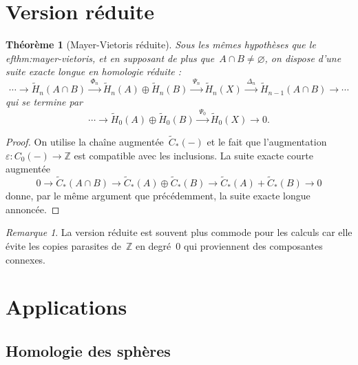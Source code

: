 \documentclass[12pt,a4paper,openany]{book}
\theoremstyle{definition}
\theoremstyle{plain}
\newtheorem{theoreme}[definition]{Théorème}
\theoremstyle{remark}
\newtheorem{remarque}[definition]{Remarque}
\newcommand{\Z}{\mathbb{Z}}
\begin{document}
\section{Version réduite}\label{sec:mv-reduite}

\begin{theoreme}[Mayer-Vietoris réduite]\label{thm:mv-reduite}
Sous les mêmes hypothèses que le 
ef{thm:mayer-vietoris}, et en supposant de plus
que~$A \cap B \neq \varnothing$, on dispose d'une suite exacte longue en homologie
réduite :
\[
  \cdots \longrightarrow \widetilde{H}_n(A \cap B)
  \xrightarrow{\;\Phi_n\;}
  \widetilde{H}_n(A) \oplus \widetilde{H}_n(B)
  \xrightarrow{\;\Psi_n\;}
  \widetilde{H}_n(X)
  \xrightarrow{\;\Delta_n\;}
  \widetilde{H}_{n-1}(A \cap B)
  \longrightarrow \cdots
\]
qui se termine par
\[
  \cdots \longrightarrow \widetilde{H}_0(A) \oplus \widetilde{H}_0(B)
  \xrightarrow{\;\Psi_0\;} \widetilde{H}_0(X) \longrightarrow 0.
\]
\end{theoreme}

\begin{proof}
On utilise la chaîne augmentée~$\widetilde{C}_*(-)$ et le fait que l'augmentation
$\varepsilon \colon C_0(-) \to \Z$ est compatible avec les inclusions. La suite
exacte courte augmentée
\[
  0 \to \widetilde{C}_*(A \cap B) \to \widetilde{C}_*(A) \oplus \widetilde{C}_*(B)
  \to \widetilde{C}_*(A) + \widetilde{C}_*(B) \to 0
\]
donne, par le même argument que précédemment, la suite exacte longue annoncée.
\end{proof}

\begin{remarque}\label{rem:mv-reduite-utilite}
La version réduite est souvent plus commode pour les calculs car elle évite les
copies parasites de~$\Z$ en degré~$0$ qui proviennent des composantes connexes.
\end{remarque}

\section{Applications}\label{sec:mv-applications}

\subsection{Homologie des sphères}\label{subsec:homologie-spheres}
\end{document}

